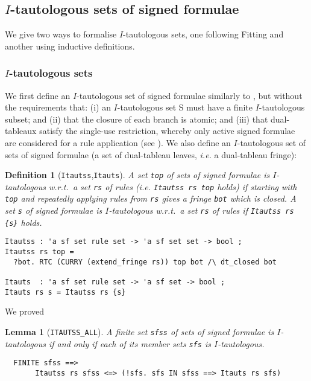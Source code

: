 \documentclass[a4paper]{article}
\newtheorem{lemma}{Lemma}
\newtheorem{definition}{Definition}
\newcommand{\ie}{\textit{i.e. }}
\begin{document}
\subsection{$I$-tautologous sets of signed formulae}

We give two ways to formalise $I$-tautologous sets, one following Fitting
and another using inductive definitions.

\subsubsection{$I$-tautologous sets }

We first define an $I$-tautologous set of signed formulae similarly to
\cite[Definition~7]{fitting-dual-tableau}, but without the
requirements that: (i) an $I$-tautologous set S must have a finite
$I$-tautologous subset; and (ii) that the closure of each branch is
atomic; and (iii) that dual-tableaux satisfy the single-use
restriction, whereby only active signed formulae are considered for a
rule application (see \cite[Definitions~1,4]{fitting-dual-tableau}).
We also define an $I$-tautologous set of sets of signed formulae (a set
of dual-tableau leaves, \ie a dual-tableau fringe):
\begin{definition}[\texttt{Itautss},\texttt{Itauts}]\label{Itauts-def}
\label{Itauts}
\label{Itautss}
A set \texttt{top} of sets of signed formulae is $I$-tautologous w.r.t.\
a set \texttt{rs} of rules (\ie \texttt{Itautss rs top} holds) if
starting with \texttt{top} and repeatedly applying rules from
\texttt{rs} gives
a fringe \texttt{bot} which is closed. A set \texttt{s} of signed
formulae is $I$-tautologous w.r.t.\ a set \texttt{rs} of rules if
\texttt{Itautss rs \{s\}} holds.
\begin{verbatim}
Itautss : 'a sf set rule set -> 'a sf set set -> bool ;
Itautss rs top = 
  ?bot. RTC (CURRY (extend_fringe rs)) top bot /\ dt_closed bot

Itauts  : 'a sf set rule set -> 'a sf set -> bool ;
Itauts rs s = Itautss rs {s} 
\end{verbatim}
\end{definition}

We proved
\begin{lemma}[\texttt{ITAUTSS\_ALL}] \label{ITAUTSS-ALL}
A finite set \texttt{sfss} of sets of signed formulae is $I$-tautologous
if and only if each of its member sets \texttt{sfs} is $I$-tautologous.
\begin{verbatim}
  FINITE sfss ==> 
       Itautss rs sfss <=> (!sfs. sfs IN sfss ==> Itauts rs sfs)
\end{verbatim}
\end{lemma}
\end{document}
